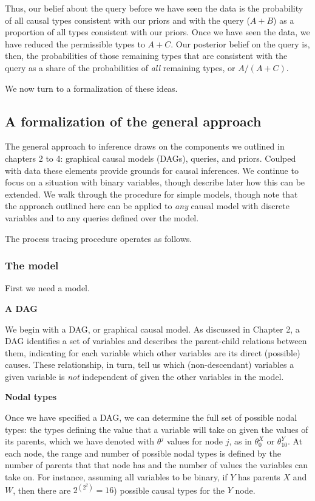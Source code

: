 \documentclass[
  12pt,
]{book}
\begin{document}
Thus, our belief about the query before we have seen the data is the probability of all causal types consistent with our priors and with the query (\(A + B\)) as a proportion of all types consistent with our priors. Once we have seen the data, we have reduced the permissible types to \(A + C\). Our posterior belief on the query is, then, the probabilities of those remaining types that are consistent with the query as a share of the probabilities of \emph{all} remaining types, or \(A/(A+C)\).

We now turn to a formalization of these ideas.

\hypertarget{a-formalization-of-the-general-approach}{%
\subsection{A formalization of the general approach}\label{a-formalization-of-the-general-approach}}

The general approach to inference draws on the components we outlined in chapters 2 to 4: graphical causal models (DAGs), queries, and priors. Coulped with data these elements provide grounds for causal inferences. We continue to focus on a situation with binary variables, though describe later how this can be extended. We walk through the procedure for simple models, though note that the approach outlined here can be applied to \emph{any} causal model with discrete variables and to any queries defined over the model.

The process tracing procedure operates as follows.

\hypertarget{the-model}{%
\subsubsection{The model}\label{the-model}}

First we need a model.

\textbf{A DAG}

We begin with a DAG, or graphical causal model. As discussed in Chapter 2, a DAG identifies a set of variables and describes the parent-child relations between them, indicating for each variable which other variables are its direct (possible) causes. These relationship, in turn, tell us which (non-descendant) variables a given variable is \emph{not} independent of given the other variables in the model.

\textbf{Nodal types}

Once we have specified a DAG, we can determine the full set of possible nodal types: the types defining the value that a variable will take on given the values of its parents, which we have denoted with \(\theta^j\) values for node \(j\), as in \(\theta^X_{0}\) or \(\theta^Y_{10}\). At each node, the range and number of possible nodal types is defined by the number of parents that that node has and the number of values the variables can take on. For instance, assuming all variables to be binary, if \(Y\) has parents \(X\) and \(W\), then there are \(2^{\left(2^2\right)}=16\)) possible causal types for the \(Y\) node.
\end{document}
